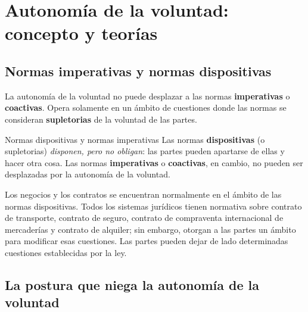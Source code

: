 \documentclass[12pt,oneside]{book}
\begin{document}
\tableofcontents
\clearpage


\chapter[Autonom\'ia de la voluntad]{Autonom\'ia de la voluntad: concepto y teor\'ias}

\section{Normas imperativas y normas dispositivas}


La autonom\'ia de la voluntad no puede desplazar a las normas \textbf{imperativas} o \textbf{coactivas}. Opera solamente en un \'ambito de cuestiones donde las normas se consideran \textbf{supletorias} de la voluntad de las partes.

\begin{definition}{Normas dispositivas y normas imperativas}
Las normas \textbf{dispositivas} (o supletorias) \emph{disponen, pero no obligan}: las partes pueden apartarse de ellas y hacer otra cosa. Las normas \textbf{imperativas} o \textbf{coactivas}, en cambio, no pueden ser desplazadas por la autonom\'ia de la voluntad.
\end{definition}

Los negocios y los contratos se encuentran normalmente en el \'ambito de las normas dispositivas. Todos los sistemas jur\'idicos tienen normativa sobre contrato de transporte, contrato de seguro, contrato de compraventa internacional de mercader\'ias y contrato de alquiler; sin embargo, otorgan a las partes un \'ambito para modificar esas cuestiones. Las partes pueden dejar de lado determinadas cuestiones establecidas por la ley.

\section{La postura que niega la autonom\'ia de la voluntad}
\end{document}
